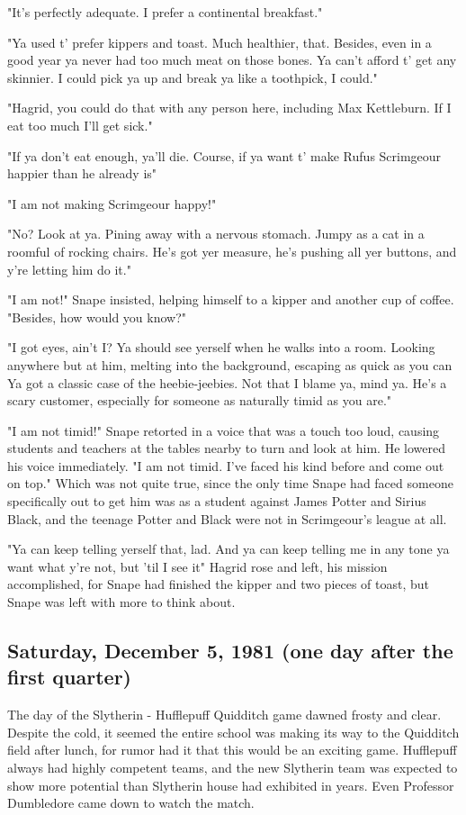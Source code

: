 "It's perfectly adequate. I prefer a continental breakfast."

"Ya used t' prefer kippers and toast. Much healthier, that. Besides, even in a good year ya never had too much meat on those bones. Ya can't afford t' get any skinnier. I could pick ya up and break ya like a toothpick, I could."

"Hagrid, you could do that with any person here, including Max Kettleburn. If I eat too much I'll get sick."

"If ya don't eat enough, ya'll die. Course, if ya want t' make Rufus Scrimgeour happier than he already is{\el}"

"I am not making Scrimgeour happy!"

"No? Look at ya. Pining away with a nervous stomach. Jumpy as a cat in a roomful of rocking chairs. He's got yer measure, he's pushing all yer buttons, and y're letting him do it."

"I am not!" Snape insisted, helping himself to a kipper and another cup of coffee. "Besides, how would you know?"

"I got eyes, ain't I? Ya should see yerself when he walks into a room. Looking anywhere but at him, melting into the background, escaping as quick as you can{\el} Ya got a classic case of the heebie-jeebies. Not that I blame ya, mind ya. He's a scary customer, especially for someone as naturally timid as you are."

"I am not timid!" Snape retorted in a voice that was a touch too loud, causing students and teachers at the tables nearby to turn and look at him. He lowered his voice immediately. "I am not timid. I've faced his kind before and come out on top." Which was not quite true, since the only time Snape had faced someone specifically out to get him was as a student against James Potter and Sirius Black, and the teenage Potter and Black were not in Scrimgeour's league at all.

"Ya can keep telling yerself that, lad. And ya can keep telling me in any tone ya want what y're not, but 'til I see it{\el}" Hagrid rose and left, his mission accomplished, for Snape had finished the kipper and two pieces of toast, but Snape was left with more to think about.

\subsection{Saturday, December 5, 1981 (one day after the first quarter)}

The day of the Slytherin - Hufflepuff Quidditch game dawned frosty and clear. Despite the cold, it seemed the entire school was making its way to the Quidditch field after lunch, for rumor had it that this would be an exciting game. Hufflepuff always had highly competent teams, and the new Slytherin team was expected to show more potential than Slytherin house had exhibited in years. Even Professor Dumbledore came down to watch the match.

